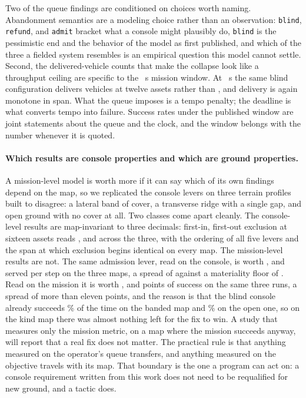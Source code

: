 \documentclass[11pt]{article}
\begin{document}
Two of the queue findings are conditioned on choices worth naming. Abandonment semantics are a modeling choice rather than an observation: \texttt{blind}, \texttt{refund}, and \texttt{admit} bracket what a console might plausibly do, \texttt{blind} is the pessimistic end and the behavior of the model as first published, and which of the three a fielded system resembles is an empirical question this model cannot settle. Second, the delivered-vehicle counts that make the collapse look like a throughput ceiling are specific to the \qDeadline{}~s mission window. At \qLongWindow{}~s the same blind configuration delivers \qArrivedTwelveLong{} vehicles at twelve assets rather than \qArrivedTwelve{}, and delivery is again monotone in span. What the queue imposes is a tempo penalty; the deadline is what converts tempo into failure. Success rates under the published window are joint statements about the queue and the clock, and the window belongs with the number whenever it is quoted.

\paragraph{Which results are console properties and which are ground properties.} A mission-level
model is worth more if it can say which of its own findings depend on the map, so we replicated the
console levers on three terrain profiles built to disagree: a lateral band of cover, a transverse
ridge with a single gap, and open ground with no cover at all. Two classes come apart cleanly. The
console-level results are map-invariant to three decimals: first-in, first-out exclusion at sixteen
assets reads \FmBandFifo{}, \FmChokeFifo{} and \FmOpenFifo{} across the three, with the ordering of
all five levers and the span at which exclusion begins identical on every map. The mission-level
results are not. The same admission lever, read on the console, is worth \MpBandSrvFull{},
\MpChokeSrvFull{} and \MpOpenSrvFull{} served per step on the three maps, a spread of
\MpSrvSpread{} against a materiality floor of \MpMPE{}. Read on the mission it is worth
\MpBandSucFull{}, \MpChokeSucFull{} and \MpOpenSucFull{} points of success on the same three runs,
a spread of more than eleven points, and the reason is that the blind console already succeeds
\MpBandBlindFull\% of the time on the banded map and \MpOpenBlindFull\% on the open one, so on
the kind map there was almost nothing left for the fix to win. A study that measures only the
mission metric, on a map where the mission succeeds anyway, will report that a real fix does not
matter. The practical rule is that anything measured on the
operator's queue transfers, and anything measured on the objective travels with its map. That
boundary is the one a program can act on: a console requirement written from this work does not need
to be requalified for new ground, and a tactic does.
\end{document}
